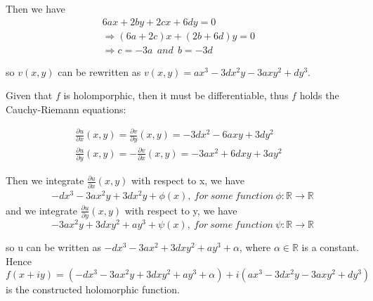 \documentclass[11pt, oneside]{article}   	%
\begin{document}
Then we have 
\begin{align*}
	6ax+2by+2cx+6dy = 0
	&
	\\
	\Rightarrow(6a+2c)x+(2b+6d)y = 0
	&
	\\
	\Rightarrow c = -3a \ \ and\  \ b=-3d
\end{align*} 

so \(v(x,y)\) can be rewritten as \(v(x,y) = ax^3-3dx^2y-3axy^2+dy^3\).

Given that \(f\) is holomporphic, then it must be differentiable, thus \(f\) holds the Cauchy-Riemann equations:

\begin{align*}
	\frac{\partial{u}}{\partial{x}}(x,y)=\frac{\partial{v}}{\partial{y}}(x,y) = -3dx^2-6axy+3dy^2
	&
	\\
	\frac{\partial{u}}{\partial{y}}(x,y)= -\frac{\partial{v}}{\partial{x}}(x,y) = -3ax^2+6dxy+3ay^2
\end{align*}

Then we integrate \(\frac{\partial{u}}{\partial{x}}(x,y)\) with respect to x, we have
\begin{align*}
	-dx^3-3ax^2y+3dx^2y+\phi(x), \ for \ some \ function \ \phi:\mathbb{R} \rightarrow \mathbb{R}
\end{align*}
and we integrate \(\frac{\partial{u}}{\partial{y}}(x,y)\) with respect to y, we have
\begin{equation*}
	 -3ax^2y+3dxy^2+ay^3+\psi(x), \ for \ some \ function \ \psi:\mathbb{R} \rightarrow \mathbb{R}
\end{equation*}

so u can be written as \(-dx^3-3ax^2+3dxy^2+ay^3+ \alpha\), where \(\alpha \in \mathbb{R}\) is a constant.
Hence \(f(x+iy) = (-dx^3-3ax^2y+3dxy^2+ay^3+\alpha)+i(ax^3-3dx^2y-3axy^2+dy^3)\) is the constructed holomorphic function.























































  
  
	


	
\end{document}
